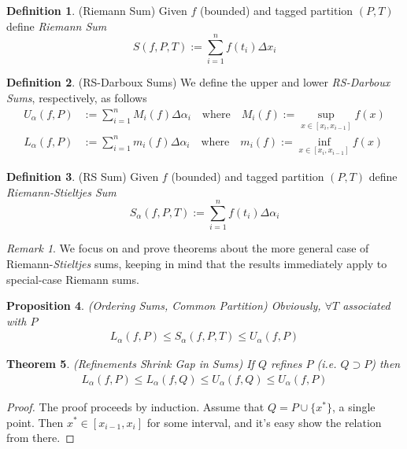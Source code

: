 \documentclass[12pt]{book}
\numberwithin{equation}{section} %
\theoremstyle{plain}
\newtheorem{thm}{Theorem}[section]
\newtheorem{prop}[thm]{Proposition}
\theoremstyle{definition}
\newtheorem{defn}[thm]{Definition}
\theoremstyle{remark}
\newtheorem*{rmk}{Remark}
\begin{document}
\begin{defn}(Riemann Sum)
Given $f$ (bounded) and tagged partition $(P,T)$ define
\emph{Riemann Sum}
\begin{equation}
    S(f,P,T) := \sum^n_{i=1} f(t_i) \Delta x_i
\end{equation}
\end{defn}

\begin{defn}(RS-Darboux Sums)
\label{RSD}
We define the upper and lower \emph{RS-Darboux Sums}, respectively, as
follows
\begin{align*}
    U_\alpha(f,P) &:= \sum^n_{i=1} M_i(f) \Delta \alpha_i
        \quad\text{where} \quad
        M_i(f) := \sup_{x \in [x_i, x_{i-1}]} f(x) \\
    L_\alpha(f,P) &:= \sum^n_{i=1} m_i(f)\Delta \alpha_i
        \quad\text{where} \quad
        m_i(f) := \inf_{x \in [x_i, x_{i-1}]} f(x)
\end{align*}
\end{defn}

\begin{defn}(RS Sum)
\label{RSS}
Given $f$ (bounded) and tagged partition $(P,T)$ define
\emph{Riemann-Stieltjes Sum}
    \begin{equation}
        S_\alpha(f,P,T) := \sum^n_{i=1} f(t_i) \Delta \alpha_i
    \end{equation}
\end{defn}

\begin{rmk}
We focus on and prove theorems about
the more general case of Riemann-\emph{Stieltjes} sums, keeping in mind
that the results immediately apply to special-case Riemann sums.
\end{rmk}


\begin{prop}\emph{(Ordering Sums, Common Partition)}
\label{sumineqP}
Obviously, $\forall T$ associated with $P$
\begin{align*}
  L_\alpha(f,P) \leq S_\alpha(f,P,T) \leq U_\alpha(f,P)
\end{align*}
\end{prop}

\begin{thm}\emph{(Refinements Shrink Gap in Sums)}
\label{sumineq}
If $Q$ refines $P$ (i.e. $Q\supset P$) then
\begin{align*}
  L_\alpha(f,P) \leq L_\alpha(f,Q) \leq U_\alpha(f,Q) \leq U_\alpha(f,P)
\end{align*}
\end{thm}
\begin{proof}
The proof proceeds by induction. Assume that $Q = P \cup \{x^*\}$, a
single point. Then $x^*\in [x_{i-1}, x_i]$ for some interval, and it's
easy show the relation from there.
\end{proof}
\end{document}

